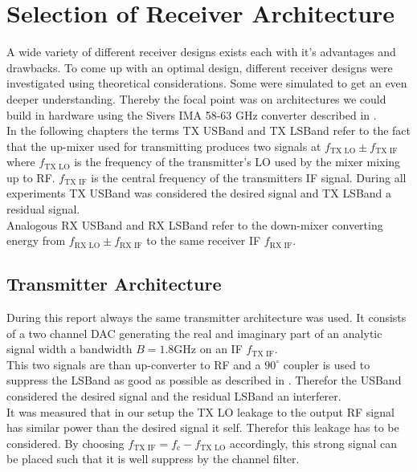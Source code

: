 \chapter{Selection of Receiver Architecture}
\label{chap:rx}

A wide variety of different receiver designs exists each with it's advantages
and drawbacks. To come up with an optimal design, different receiver designs
were investigated using theoretical considerations. Some were simulated to
get an even deeper understanding.
Thereby the focal point was on architectures we could
build in hardware using the Sivers IMA 58-63 GHz converter described in
. \\

In the following chapters the terms \gls{TX} \gls{USBand} and \gls{TX}
\gls{LSBand} refer to the fact that the up-mixer used for transmitting
produces two signals at $f_{\text{TX LO}} \pm f_{\text{TX IF}}$ where
$f_{\text{TX LO}}$ is the frequency of the transmitter's \gls{LO}
used by the mixer mixing up to \gls{RF}. $f_{\text{TX IF}}$ is the central
frequency of the transmitters \gls{IF} signal. During all experiments
\gls{TX} \gls{USBand} was considered the desired signal and \gls{TX}
\gls{LSBand} a residual signal. \\

Analogous \gls{RX} \gls{USBand} and \gls{RX} \gls{LSBand} refer to
the down-mixer converting energy from $f_{\text{RX LO}} \pm f_{\text{RX IF}}$
to the same receiver \gls{IF} $f_{\text{RX IF}}$. \\

\section{Transmitter Architecture}
During this report always the same transmitter architecture was used.
It consists of a two channel \gls{DAC} generating the real and imaginary
part of an analytic signal width a bandwidth $B = 1.8 \text{GHz}$
on an \gls{IF} $f_{\text{TX IF}}$. \\

This two signals are than up-converter to
\gls{RF} and a $90^\circ$ coupler is used to suppress the \gls{LSBand}
as good as possible as described in .
Therefor the \gls{USBand} considered the desired signal and the
residual \gls{LSBand} an interferer. \\

It was measured that in our setup the \gls{TX} \gls{LO} leakage
to the output \gls{RF} signal has similar power than the desired
signal it self. Therefor this leakage has to be considered.
By choosing $f_{\text{TX IF}} = f_{\text{c}} - f_{\text{TX LO}}$ accordingly,
this strong signal can be placed such that it is well suppress by the channel
filter. \\

